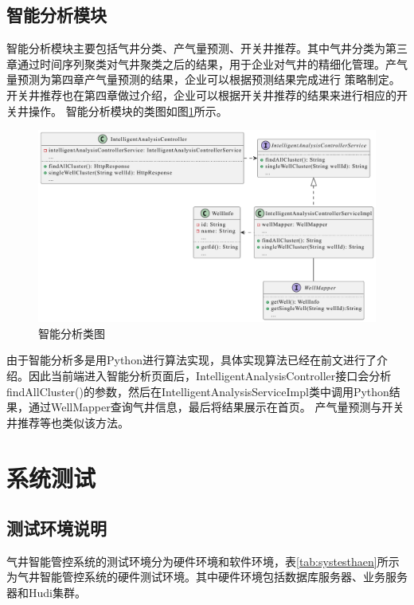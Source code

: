 \subsection{智能分析模块}
智能分析模块主要包括气井分类、产气量预测、开关井推荐。其中气井分类为第三章通过时间序列聚类对气井聚类之后的结果，用于企业对气井的精细化管理。产气量预测为第四章产气量预测的结果，企业可以根据预测结果完成进行
策略制定。开关井推荐也在第四章做过介绍，企业可以根据开关井推荐的结果来进行相应的开关井操作。
智能分析模块的类图如图\ref{fig:analyclass}所示。
\begin{figure}[H]
    \centering
    \includegraphics[width=.9\linewidth]{figure/智能分析类图.pdf}
    \caption{智能分析类图}
    \label{fig:analyclass}
\end{figure}
由于智能分析多是用Python进行算法实现，具体实现算法已经在前文进行了介绍。因此当前端进入智能分析页面后，IntelligentAnalysisController接口会分析findAllCluster()的参数，然后在IntelligentAnalysisServiceImpl类中调用Python结果，通过WellMapper查询气井信息，最后将结果展示在首页。
产气量预测与开关井推荐等也类似该方法。
\section{系统测试}
\subsection{测试环境说明}
气井智能管控系统的测试环境分为硬件环境和软件环境，表\ref{tab:systesthaen}所示为气井智能管控系统的硬件测试环境。其中硬件环境包括数据库服务器、业务服务器和Hudi集群。

